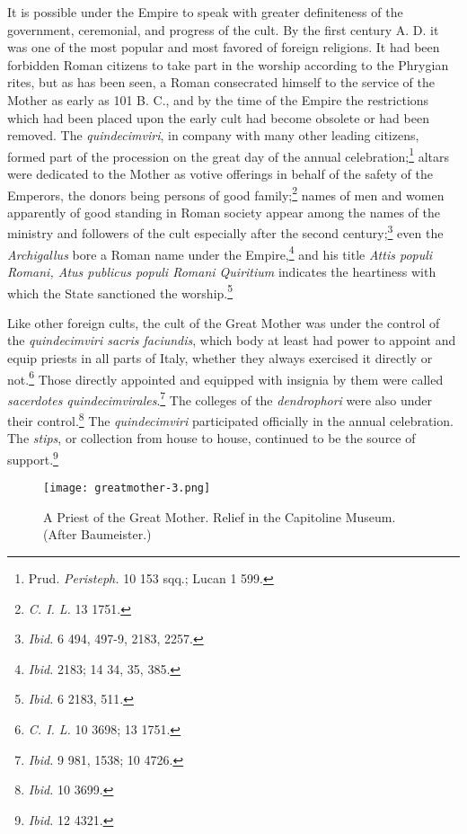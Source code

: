 \documentclass[a4paper, 11pt, oneside, polutonikogreek, english]{article}
\begin{document}
It is possible under the Empire to speak with greater definiteness of the government, ceremonial, and progress of the cult. By the first century A. D. it was one of the most popular and most favored of foreign religions. It had been forbidden Roman citizens to take part in the worship according to the Phrygian rites, but as has been seen, a Roman consecrated himself to the service of the Mother as early as 101 B. C., and by the time of the Empire the restrictions which had been placed upon the early cult had become obsolete or had been removed. The \emph{quindecimviri}, in company with many other leading citizens, formed part of the procession on the great day of the annual celebration;\footnote{Prud. \emph{Peristeph.} 10 153 sqq.; Lucan 1 599.} altars were dedicated to the Mother as votive offerings in behalf of the safety of the Emperors, the donors being persons of good family;\footnote{\emph{C. I. L.} 13 1751.} names of men and women apparently of good standing in Roman society appear among the names of the ministry and followers of the cult especially after the second century;\footnote{\emph{Ibid.} 6 494, 497-9, 2183, 2257.} even the \emph{Archigallus} bore a Roman name under the Empire,\footnote{\emph{Ibid.} 2183; 14 34, 35, 385.} and his title \emph{Attis populi Romani, Atus publicus populi Romani Quiritium} indicates the heartiness with which the State sanctioned the worship.\footnote{\emph{Ibid.} 6 2183, 511.}

Like other foreign cults, the cult of the Great Mother was under the control of the \emph{quindecimviri sacris faciundis}, which body at least had power to appoint and equip priests in all parts of Italy, whether they always exercised it directly or not.\footnote{\emph{C. I. L.} 10 3698; 13 1751.} Those directly appointed and equipped with insignia by them were called \emph{sacerdotes quindecimvirales}.\footnote{\emph{Ibid.} 9 981, 1538; 10 4726.} The colleges of the \emph{dendrophori} were also under their control.\footnote{\emph{Ibid.} 10 3699.} The \emph{quindecimviri} participated officially in the annual celebration. The \emph{stips}, or collection from house to house, continued to be the source of support.\footnote{\emph{Ibid.} 12 4321.}

\begin{figure}[H]
\centering
\texttt{[image: greatmother-3.png]}
\caption{A Priest of the Great Mother. Relief in the Capitoline Museum. (After Baumeister.)}
\end{figure}
\end{document}

